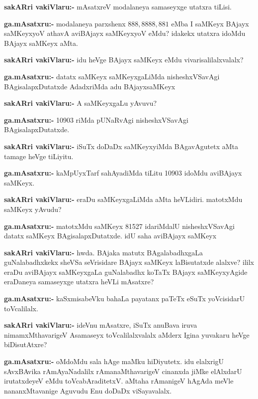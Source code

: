 \smallskip
\noindent
\textbf{sakARri vakiVlaru:-} mAsatxreV modalaneya samaseyxge utatxra tiLisi.

\smallskip
\noindent
\textbf{ga.mAsatxru:-} modalaneya parxshenx $888, 8888, 881$ eMba I saMKeyx BAjayx saMKeyxyoV athavA aviBAjayx saMKeyxyoV eMdu? idakekx utatxra idoMdu BAjayx saMKeyx aMta.

\smallskip
\noindent
\textbf{sakARri vakiVlaru:-} idu heVge BAjayx saMKeyx eMdu vivarisalilalxvalalx?

\smallskip
\noindent
\textbf{ga.mAsatxru:-} datatx saMKeyx saMKeyxgaLiMda nisheshxVSavAgi BAgisalapxDutatxde AdadxriMda adu BAjayxsaMKeyx

\smallskip
\noindent
\textbf{sakARri vakiVlaru:-} A saMKeyxgaLu yAvuvu?

\smallskip
\noindent
\textbf{ga.mAsatxru:-} {\rm 10903} riMda pUNaRvAgi nisheshxVSavAgi BAgisalapxDutatxde.

\smallskip
\noindent
\textbf{sakARri vakiVlaru:-} iSuTx doDaDx saMKeyxyiMda BAgavAgutetx aMta tamage heVge tiLiyitu.

\smallskip
\noindent
\textbf{ga.mAsatxru:-} kaMpUyxTarf sahAyadiMda tiLitu {\rm 10903} idoMdu aviBAjayx saMKeyx.

\smallskip
\noindent
\textbf{sakARri vakiVlaru:-} eraDu saMKeyxgaLiMda aMta heVLidiri. matotxMdu saMKeyx yAvudu?

\smallskip
\noindent
\textbf{ga.mAsatxru:-} matotxMdu saMKeyx {\rm 81527} idariMdalU nisheshxVSavAgi datatx saMKeyx BAgisalapxDutatxde. idU saha aviBAjayx saMKeyx

\smallskip
\noindent
\textbf{sakARri vakiVlaru:-} hwda. BAjaka matutx BAgalabadhxgaLa guNalabadhxkekx sheVSa seVrisidare BAjayx saMKeyx laBisutatxde alalxve? ililx eraDu aviBAjayx saMKeyxgaLa guNalabadhx koTaTx BAjayx saMKeyxyAgide eraDaneya samaseyxge utatxra heVLi mAsatxre?

\smallskip
\noindent
\textbf{ga.mAsatxru:-} kaSxmisabeVku bahaLa payatanx paTeTx eSuTx yoVcisidarU toVcalilalx.

\smallskip
\noindent
\textbf{sakARri vakiVlaru:-} ideVnu mAsatxre, iSuTx anuBava iruva nimamxMthavarigeV Asamaseyx toVcalilalxvalalx aMderx Igina yuvakaru heVge biDisutAtxre?

\smallskip
\noindent
\textbf{ga.mAsatxru:-} oMdoMdu sala hAge maMku hiDiyutetx. idu elalxrigU sAvxBAvika rAmAyaNadalilx rAmanaMthavarigeV cinanxda jiMke elAlxdarU irutatxdeyeV eMdu toVcabAraditetxV. aMtaha rAmanigeV hAgAda meVle nananxMtavanige Aguvudu Enu doDaDx viSayavalalx.

